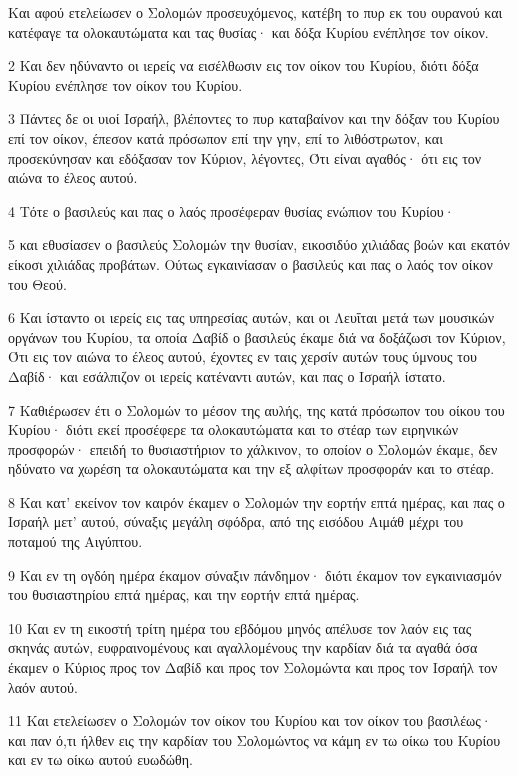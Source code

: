 \par Και αφού ετελείωσεν ο Σολομών προσευχόμενος, κατέβη το πυρ εκ του ουρανού και κατέφαγε τα ολοκαυτώματα και τας θυσίας· και δόξα Κυρίου ενέπλησε τον οίκον.
\par 2 Και δεν ηδύναντο οι ιερείς να εισέλθωσιν εις τον οίκον του Κυρίου, διότι δόξα Κυρίου ενέπλησε τον οίκον του Κυρίου.
\par 3 Πάντες δε οι υιοί Ισραήλ, βλέποντες το πυρ καταβαίνον και την δόξαν του Κυρίου επί τον οίκον, έπεσον κατά πρόσωπον επί την γην, επί το λιθόστρωτον, και προσεκύνησαν και εδόξασαν τον Κύριον, λέγοντες, Ότι είναι αγαθός· ότι εις τον αιώνα το έλεος αυτού.
\par 4 Τότε ο βασιλεύς και πας ο λαός προσέφεραν θυσίας ενώπιον του Κυρίου·
\par 5 και εθυσίασεν ο βασιλεύς Σολομών την θυσίαν, εικοσιδύο χιλιάδας βοών και εκατόν είκοσι χιλιάδας προβάτων. Ούτως εγκαινίασαν ο βασιλεύς και πας ο λαός τον οίκον του Θεού.
\par 6 Και ίσταντο οι ιερείς εις τας υπηρεσίας αυτών, και οι Λευΐται μετά των μουσικών οργάνων του Κυρίου, τα οποία Δαβίδ ο βασιλεύς έκαμε διά να δοξάζωσι τον Κύριον, Ότι εις τον αιώνα το έλεος αυτού, έχοντες εν ταις χερσίν αυτών τους ύμνους του Δαβίδ· και εσάλπιζον οι ιερείς κατέναντι αυτών, και πας ο Ισραήλ ίστατο.
\par 7 Καθιέρωσεν έτι ο Σολομών το μέσον της αυλής, της κατά πρόσωπον του οίκου του Κυρίου· διότι εκεί προσέφερε τα ολοκαυτώματα και το στέαρ των ειρηνικών προσφορών· επειδή το θυσιαστήριον το χάλκινον, το οποίον ο Σολομών έκαμε, δεν ηδύνατο να χωρέση τα ολοκαυτώματα και την εξ αλφίτων προσφοράν και το στέαρ.
\par 8 Και κατ' εκείνον τον καιρόν έκαμεν ο Σολομών την εορτήν επτά ημέρας, και πας ο Ισραήλ μετ' αυτού, σύναξις μεγάλη σφόδρα, από της εισόδου Αιμάθ μέχρι του ποταμού της Αιγύπτου.
\par 9 Και εν τη ογδόη ημέρα έκαμον σύναξιν πάνδημον· διότι έκαμον τον εγκαινιασμόν του θυσιαστηρίου επτά ημέρας, και την εορτήν επτά ημέρας.
\par 10 Και εν τη εικοστή τρίτη ημέρα του εβδόμου μηνός απέλυσε τον λαόν εις τας σκηνάς αυτών, ευφραινομένους και αγαλλομένους την καρδίαν διά τα αγαθά όσα έκαμεν ο Κύριος προς τον Δαβίδ και προς τον Σολομώντα και προς τον Ισραήλ τον λαόν αυτού.
\par 11 Και ετελείωσεν ο Σολομών τον οίκον του Κυρίου και τον οίκον του βασιλέως· και παν ό,τι ήλθεν εις την καρδίαν του Σολομώντος να κάμη εν τω οίκω του Κυρίου και εν τω οίκω αυτού ευωδώθη.
